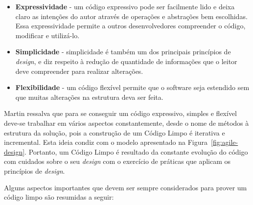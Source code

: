 %

\begin{itemize}
\item \textbf{Expressividade} - um código expressivo pode ser facilmente lido e deixa claro as intenções do autor através de operações e abstrações bem escolhidas. Essa expressividade permite a outros desenvolvedores compreender o código, modificar e utilizá-lo.

\item \textbf{Simplicidade} - simplicidade é também um dos principais princípios de \emph{design}, e diz respeito à redução de quantidade de informações que o leitor deve compreender para realizar alterações.

\item \textbf{Flexibilidade} - um código flexível permite que o software seja estendido sem que muitas alterações na estrutura deva ser feita.
\end{itemize}

%

Martin ressalva que para se conseguir um código expressivo, simples e flexível deve-se trabalhar em vários aspectos constantemente, desde o nome de métodos à estrutura da solução, pois a construção de um Código Limpo é iterativa e incremental. Esta ideia condiz com o modelo apresentado na Figura~\ref{fig:agile-design}. Portanto, um Código Limpo é resultado da constante evolução do código com cuidados sobre o seu \emph{design} com o exercício de práticas que aplicam os princípios de \emph{design}. 

%

Alguns aspectos importantes que devem ser sempre considerados para prover um código limpo são resumidas a seguir:

